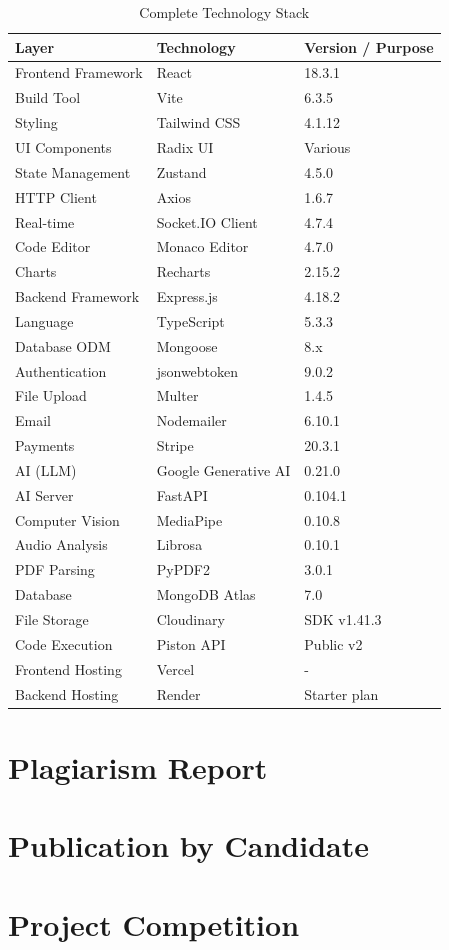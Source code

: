 \begin{appendices}
\begin{table}[H]
\centering
\caption{Complete Technology Stack}
\vspace{8pt}
\begin{tabularx}{\textwidth}{|L{3cm}|L{3.5cm}|X|}
\hline
\textbf{Layer} & \textbf{Technology} & \textbf{Version / Purpose} \\
\hline
Frontend Framework & React & 18.3.1 \\
\hline
Build Tool & Vite & 6.3.5 \\
\hline
Styling & Tailwind CSS & 4.1.12 \\
\hline
UI Components & Radix UI & Various \\
\hline
State Management & Zustand & 4.5.0 \\
\hline
HTTP Client & Axios & 1.6.7 \\
\hline
Real-time & Socket.IO Client & 4.7.4 \\
\hline
Code Editor & Monaco Editor & 4.7.0 \\
\hline
Charts & Recharts & 2.15.2 \\
\hline
Backend Framework & Express.js & 4.18.2 \\
\hline
Language & TypeScript & 5.3.3 \\
\hline
Database ODM & Mongoose & 8.x \\
\hline
Authentication & jsonwebtoken & 9.0.2 \\
\hline
File Upload & Multer & 1.4.5 \\
\hline
Email & Nodemailer & 6.10.1 \\
\hline
Payments & Stripe & 20.3.1 \\
\hline
AI (LLM) & Google Generative AI & 0.21.0 \\
\hline
AI Server & FastAPI & 0.104.1 \\
\hline
Computer Vision & MediaPipe & 0.10.8 \\
\hline
Audio Analysis & Librosa & 0.10.1 \\
\hline
PDF Parsing & PyPDF2 & 3.0.1 \\
\hline
Database & MongoDB Atlas & 7.0 \\
\hline
File Storage & Cloudinary & SDK v1.41.3 \\
\hline
Code Execution & Piston API & Public v2 \\
\hline
Frontend Hosting & Vercel & - \\
\hline
Backend Hosting & Render & Starter plan \\
\hline
\end{tabularx}
\label{tab:techstack}
\end{table}

\section{Plagiarism Report}
\newpage

\section{Publication by Candidate}
\newpage

\section{Project Competition}

\end{appendices}
